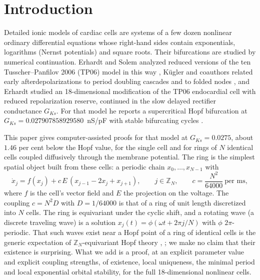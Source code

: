 \documentclass[11pt]{article}
\theoremstyle{definition}
\newcommand{\Z}{\mathbb{Z}}
\begin{document}
\section{Introduction}\label{sec:intro}

Detailed ionic models of cardiac cells are systems of a few dozen nonlinear ordinary differential equations whose right-hand sides contain exponentials, logarithms (Nernst potentials) and square roots. Their bifurcations are studied by numerical continuation. Erhardt and Solem analyzed reduced versions of the ten Tusscher--Panfilov 2006 (TP06) model \cite{tp2006} in this way \cite{es2021,es2022}, K\"ugler and coauthors related early afterdepolarizations to period doubling cascades and to folded nodes \cite{keb2017,keb2018}, and Erhardt \cite{erhardt2025} studied an 18-dimensional modification of the TP06 endocardial cell with reduced repolarization reserve, continued in the slow delayed rectifier conductance $G_{Ks}$. For that model he reports a supercritical Hopf bifurcation at $G_{Ks} = 0.027907858929580$~nS/pF with stable bifurcating cycles \cite[Table~2]{erhardt2025}.

This paper gives computer-assisted proofs for that model at $G_{Ks} = 0.0275$, about $1.46$ per cent below the Hopf value, for the single cell and for rings of $N$ identical cells coupled diffusively through the membrane potential. The ring is the simplest spatial object built from these cells: a periodic chain $x_0, \dots, x_{N-1}$ with
\begin{equation}\label{eq:ring}
  \dot x_j = f(x_j) + c\, E\,(x_{j-1} - 2x_j + x_{j+1}), \qquad j \in \Z_N, \qquad c = \frac{N^2}{64000}\ \text{per ms},
\end{equation}
where $f$ is the cell's vector field and $E$ the projection on the voltage. The coupling $c = N^2 D$ with $D = 1/64000$ is that of a ring of unit length discretized into $N$ cells. The ring is equivariant under the cyclic shift, and a rotating wave (a discrete traveling wave) is a solution $x_j(t) = \phi(\omega t + 2\pi j/N)$ with $\phi$ $2\pi$-periodic. That such waves exist near a Hopf point of a ring of identical cells is the generic expectation of $\Z_N$-equivariant Hopf theory \cite{gs1985}, \cite[Ch.~XVIII, Sect.~4]{gss1988}; we make no claim that their existence is surprising. What we add is a proof, at an explicit parameter value and explicit coupling strengths, of existence, local uniqueness, the minimal period and local exponential orbital stability, for the full 18-dimensional nonlinear cells.
\end{document}
